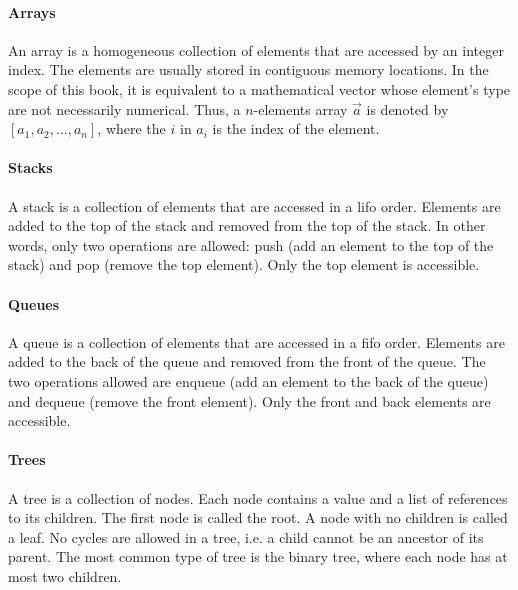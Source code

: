 \paragraph{Arrays}  An array is a homogeneous collection of elements that are accessed by
an integer index.  The elements are usually stored in contiguous memory locations.
In the scope of this book, it is equivalent to a mathematical vector whose element's type
are not necessarily numerical.  Thus, a $n$-elements array $\vec{a}$ is denoted by
$\left[a_1, a_2, \dots, a_n\right]$, where the $i$ in $a_i$ is the index of the element.


\paragraph{Stacks}  A stack is a collection of elements that are accessed in a
\gls{lifo} order.  Elements are added to the top of the stack and
removed from the top of the stack.  In other words, only two operations are
allowed: push (add an element to the top of the stack) and pop (remove the top element).
Only the top element is accessible.

\paragraph{Queues}  A queue is a collection of elements that are accessed in a
\gls{fifo} order.  Elements are added to the back of the queue and
removed from the front of the queue.  The two operations allowed are enqueue (add an
element to the back of the queue) and dequeue (remove the front element).  Only the
front and back elements are accessible.

\paragraph{Trees}  A tree is a collection of nodes.  Each node contains a value and a list
of references to its children.  The first node is called the root.  A node with no
children is called a leaf.  No cycles are allowed in a tree, i.e. a child cannot be an
ancestor of its parent. The most common type of tree is the binary tree, where each node
has at most two children.

